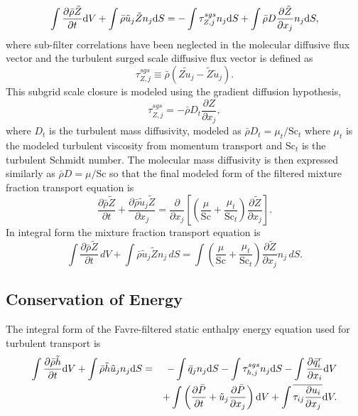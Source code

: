 \begin{equation}
\int \frac{\partial \bar{\rho} \tilde{Z}}{\partial t} {\rm d}V
  + \int \bar{\rho} \tilde{u}_j \tilde{Z} n_j {\rm d}S
  = -\int \tau^{sgs}_{Z,j} n_j {\rm d}S + \int \bar{\rho} D \frac{\partial \tilde{Z}}{\partial x_j} n_j {\rm d}S,  \label{eqn:turb_Z}
\end{equation}
%
where sub-filter correlations have been neglected in the molecular diffusive
flux vector and the turbulent surged scale diffusive flux vector is defined as
%
\begin{equation}
\tau^{sgs}_{Z,j} \equiv \bar{\rho} \left( \widetilde{Z u_j} -
  \tilde{Z} \tilde{u}_j \right).
\end{equation}
%
This subgrid scale closure is modeled using the gradient diffusion hypothesis,
%
\begin{equation}
\tau^{sgs}_{Z,j} = - \bar{\rho} D_t \frac{\partial Z}{\partial x_j},
\end{equation}
%
where $D_t$ is the turbulent mass diffusivity, modeled as $\bar{\rho} D_t =
\mu_t / \mathrm{Sc}_t$ where $\mu_t$ is the modeled turbulent viscosity
from momentum transport and $\mathrm{Sc}_t$ is the turbulent Schmidt number.
The molecular mass
diffusivity is then expressed similarly as $\bar{\rho} D = \mu / \mathrm{Sc}$
so that the final modeled form of the filtered mixture fraction transport
equation is
%
\begin{equation}
\frac{\partial \bar{\rho} \tilde{Z}}{\partial t}
  + \frac{ \partial \bar{\rho} \tilde{u}_j \tilde{Z} }{ \partial x_j}
  = \frac{\partial}{\partial x_j} 
    \left[ \left( \frac{\mu}{\mathrm{Sc}} + \frac{\mu_t}{\mathrm{Sc}_t} \right)
    \frac{\partial \tilde{Z}}{\partial x_j} \right].
\end{equation}
%
In integral form the mixture fraction transport equation is
%
\begin{equation}
\int \frac{\partial \bar{\rho} \tilde{Z}}{\partial t}\, dV
  + \int \bar{\rho} \tilde{u}_j \tilde{Z} n_j\, dS
  = \int \left( \frac{\mu}{\mathrm{Sc}} + \frac{\mu_t}{\mathrm{Sc}_t} \right)
    \frac{\partial \tilde{Z}}{\partial x_j} n_j\, dS.
\end{equation}

\subsection{Conservation of Energy}

The integral form of the Favre-filtered static enthalpy energy equation used for
turbulent transport is
%
\begin{eqnarray}
   \int {{\partial \bar{\rho} \tilde{h}} \over {\partial t}} {\rm d}V
  + \int \bar{\rho} \tilde{h} \tilde{u}_j n_j {\rm d}S 
  &=& - \int \bar{q}_j n_j {\rm d}S
  -\int \tau^{sgs}_{h,j} n_j {\rm d}S 
  - \int {{\partial \bar{q}_i^r} \over {\partial x_i}} {\rm d}V \nonumber \\
  && + \int \left({{\partial \bar{P}} \over {\partial t}} + \tilde{u}_j {{\partial \bar{P}} \over {\partial x_j}}\right){\rm d}V
  + \int \overline{\tau_{ij} {{\partial u_i} \over {\partial x_j }}} {\rm d}V.
\label{fav-enth}
\end{eqnarray}
%

